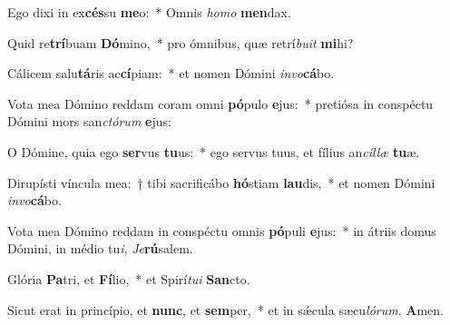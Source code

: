 ﻿\item Ego dixi in ex\textbf{cés}su \textbf{me}o:~* Omnis \textit{ho}\textit{mo} \textbf{men}dax.
\item Quid re\textbf{trí}buam \textbf{Dó}mino,~* pro ómnibus, quæ retrí\textit{bu}\textit{it} \textbf{mi}hi?
\item Cálicem salu\textbf{tá}ris ac\textbf{cí}piam:~* et nomen Dómini \textit{in}\textit{vo}\textbf{cá}bo.
\item Vota mea Dómino reddam coram omni \textbf{pó}pulo \textbf{e}jus:~* pretiósa in conspéctu Dómini mors san\textit{ctó}\textit{rum} \textbf{e}jus:
\item O Dómine, quia ego \textbf{ser}vus \textbf{tu}us:~* ego servus tuus, et fílius an\textit{cíl}\textit{læ} \textbf{tu}æ.
\item Dirupísti víncula mea:~† tibi sacrificábo \textbf{hó}stiam \textbf{lau}dis,~* et nomen Dómini \textit{in}\textit{vo}\textbf{cá}bo.
\item Vota mea Dómino reddam in conspéctu omnis \textbf{pó}puli \textbf{e}jus:~* in átriis domus Dómini, in médio tu\textit{i}, \textit{Je}\textbf{rú}salem.
\item Glória \textbf{Pa}tri, et \textbf{Fí}lio,~* et Spirí\textit{tu}\textit{i} \textbf{San}cto.
\item Sicut erat in princípio, et \textbf{nunc}, et \textbf{sem}per,~* et in sǽcula sæcu\textit{ló}\textit{rum}. \textbf{A}men.